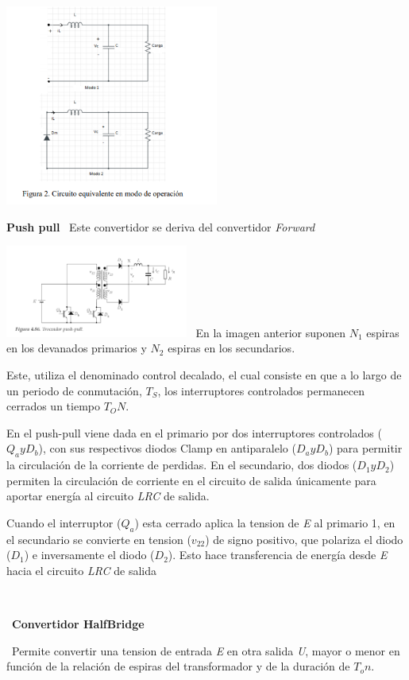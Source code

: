 \documentclass[12pt,letterpaper]{article}
\begin{document}
\includegraphics[width=7cm]{Reductor Buck 2 Maneras.png} 

\textbf{Push pull}
\
Este convertidor se deriva del convertidor \textit{Forward}
\

\includegraphics[width=6cm]{PushPull.png} 
\
En la imagen anterior suponen $N_1$ espiras en los devanados primarios y $N_2$ espiras en los secundarios.

Este, utiliza el denominado control decalado, el cual consiste en que a lo largo de un periodo de conmutación, $T_S$, los interruptores controlados permanecen cerrados un tiempo $T_ON$.

En el push-pull viene dada en el primario por dos interruptores controlados ($Q_a y D_b$), con sus respectivos diodos Clamp en antiparalelo ($D_a y D_b$) para permitir la circulación de la corriente de perdidas. En el secundario, dos diodos ($D_1 y D_2$) permiten la circulación de corriente en el circuito de salida únicamente para aportar energía al circuito \textit{LRC} de salida.
\

Cuando el interruptor ($Q_a$) esta cerrado aplica la tension de \textit{E} al primario 1, en el secundario se convierte en tension ($v_22$) de signo positivo, que polariza el diodo ($D_1$) e inversamente el diodo ($D_2$). Esto hace transferencia de energía desde \textit{E} hacia el circuito \textit{LRC} de salida

\

\
\textbf{Convertidor HalfBridge}
\

\
Permite convertir una tension de entrada \textit{E} en otra salida \textit{U}, mayor o menor en función de la relación de espiras del transformador y de la duración de \textit{$T_on$}.
\
\end{document}

